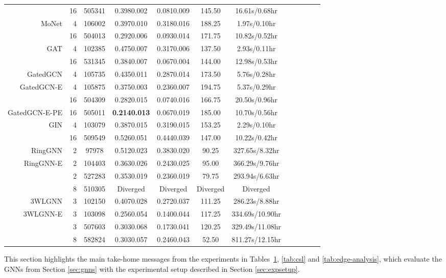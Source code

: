 \documentclass{article}
\newcommand{\best}[1]{{\color{red}\textbf{#1}}}
\newcommand{\good}[1]{{\color{violet}#1}}
\begin{document}
\begin{table}[t!]
{\begin{tabular}{rr|ccccc|ccccc}
         & 16 & 505341 & 0.3980.002 & 0.0810.009 & 145.50 & 16.61s/0.68hr & \\
\cline{1-7}
MoNet & 4 & 106002 & 0.3970.010 & 0.3180.016 & 188.25 & 1.97s/0.10hr \\
        & 16 & 504013 & 0.2920.006 & 0.0930.014 & 171.75 & 10.82s/0.52hr\\
        GAT & 4 & 102385 & 0.4750.007 & 0.3170.006 & 137.50 & 2.93s/0.11hr & \\
         & 16 & 531345 & 0.3840.007 & 0.0670.004 & 144.00 & 12.98s/0.53hr & \\
        GatedGCN & 4 & 105735 & 0.4350.011 & 0.2870.014 & 173.50 & 5.76s/0.28hr & \\
        GatedGCN-E & 4 & 105875 & 0.3750.003 & 0.2360.007 & 194.75 & 5.37s/0.29hr & \\
         & 16 & 504309 & \good{0.2820.015} & 0.0740.016 & 166.75 & 20.50s/0.96hr & \\
        GatedGCN-E-PE & 16 & 505011 & \best{0.2140.013} & 0.0670.019 & 185.00 & 10.70s/0.56hr \\
\cline{1-7}
        GIN & 4 & 103079 & 0.3870.015 & 0.3190.015 & 153.25 & 2.29s/0.10hr \\
         & 16 & 509549 & 0.5260.051 & 0.4440.039 & 147.00 & 10.22s/0.42hr \\
        RingGNN & 2 & 97978 & 0.5120.023 & 0.3830.020 & 90.25 & 327.65s/8.32hr  \\
        RingGNN-E & 2 & 104403 & 0.3630.026 & 0.2430.025 & 95.00 & 366.29s/9.76hr \\
         & 2 & 527283 & 0.3530.019 & 0.2360.019 & 79.75 & 293.94s/6.63hr \\
          & 8 & 510305 & Diverged & Diverged & Diverged & Diverged \\
        3WLGNN & 3 & 102150 & 0.4070.028 & 0.2720.037 & 111.25 & 286.23s/8.88hr  \\
        3WLGNN-E & 3 & 103098 & \good{0.2560.054} & 0.1400.044 & 117.25 & 334.69s/10.90hr \\
         & 3 & 507603 & 0.3030.068 & 0.1730.041 & 120.25 & 329.49s/11.08hr \\
         & 8 & 582824 & 0.3030.057 & 0.2460.043 & 52.50 & 811.27s/12.15hr \\
        \bottomrule
    \end{tabular}
    }
    \label{tab:results}
\end{table}
 

This section highlights the main take-home messages from the experiments in Tables~\ref{tab:results}, \ref{tab:csl} and \ref{tab:edge-analysis}, which evaluate the GNNs from Section \ref{sec:gnns} with the experimental setup described in Section \ref{sec:expsetup}. 
\end{document}
